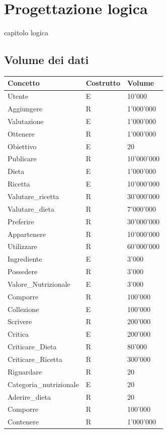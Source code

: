 ﻿\documentclass[a4paper,12pt]{report}
\begin{document}
\chapter{Progettazione logica}
capitolo logica
\section{Volume dei dati}
      
\begin{table}[H]
\center
    \begin{tabular}{ |p{1.7in}|p{0.8in}|p{1.4in}| }
        \hline
        Concetto  & Costrutto  & Volume \\
        \hline
        Utente   & E  & 10'000  \\
        Aggiungere   & R  & 1'000'000   \\
        Valutazione   & E   & 1'000'000    \\
        Ottenere & R&  1'000'000 \\
        Obiettivo & E& 20\\
        Publicare & R& 10'000'000\\
        Dieta & E& 1'000'000\\
        Ricetta & E& 10'000'000 \\
        Valutare\_ricetta & R& 30'000'000\\
        Valutare\_dieta &R & 7'000'000\\
        Preferire & R& 30'000'000\\
        Appartenere & R& 10'000'000\\
        Utilizzare & R& 60'000'000\\
        Ingrediente & E& 3'000\\
        Possedere & R& 3'000\\
        Valore\_Nutrizionale & E& 3'000\\
        Comporre & R& 100'000\\
        Collezione & E& 100'000\\
        Scrivere & R& 200'000 \\
        Critica & E& 200'000\\
        Criticare\_Dieta & R& 80'000 \\
        Criticare\_Ricetta & R& 300'000\\
        Riguardare & R& 20\\
        Categoria\_nutrizionale & E&20 \\
        Aderire\_dieta & R& 20\\
        Comporre & R& 100'000\\
        Contenere & R& 1'000'000\\
        \hline
    \end{tabular}  
\end{table}
\end{document}
